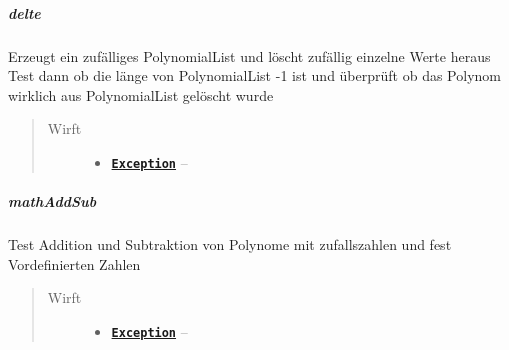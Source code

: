 \documentclass[letterpaper,10pt,ngerman]{sphinxmanual}
\begin{document}
\subparagraph{delte}
\label{com/linuxluigi/polynomial/test/PolynomialListTest:delte}

\begin{fulllineitems}
\label{com/linuxluigi/polynomial/test/PolynomialListTest:com.linuxluigi.polynomial.test.PolynomialListTest.delte()}
Erzeugt ein zufälliges PolynomialList und löscht zufällig einzelne Werte heraus Test dann ob die länge von PolynomialList -1 ist und überprüft ob das Polynom wirklich aus PolynomialList gelöscht wurde
\begin{quote}\begin{description}
\item[{Wirft}] \leavevmode\begin{itemize}
\item {} 
\href{http://docs.oracle.com/javase/8/docs/api/java/lang/Exception.html}{\textbf{\texttt{Exception}}} -- 

\end{itemize}

\end{description}\end{quote}

\end{fulllineitems}



\subparagraph{mathAddSub}
\label{com/linuxluigi/polynomial/test/PolynomialListTest:mathaddsub}

\begin{fulllineitems}
\label{com/linuxluigi/polynomial/test/PolynomialListTest:com.linuxluigi.polynomial.test.PolynomialListTest.mathAddSub()}
Test Addition und Subtraktion von Polynome mit zufallszahlen und fest Vordefinierten Zahlen
\begin{quote}\begin{description}
\item[{Wirft}] \leavevmode\begin{itemize}
\item {} 
\href{http://docs.oracle.com/javase/8/docs/api/java/lang/Exception.html}{\textbf{\texttt{Exception}}} -- 

\end{itemize}

\end{description}\end{quote}

\end{fulllineitems}
\end{document}

